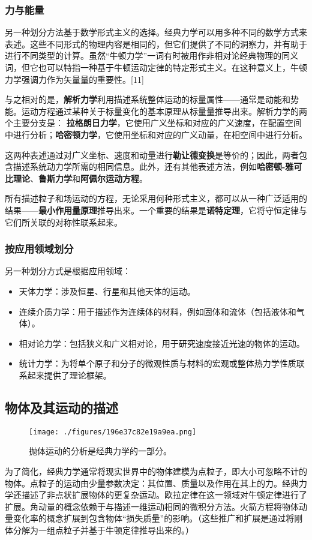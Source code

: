 \subsubsection{力与能量}  
另一种划分方法基于数学形式主义的选择。经典力学可以用多种不同的数学方式来表述。这些不同形式的物理内容是相同的，但它们提供了不同的洞察力，并有助于进行不同类型的计算。虽然“牛顿力学”一词有时被用作非相对论经典物理的同义词，但它也可以特指一种基于牛顿运动定律的特定形式主义。在这种意义上，牛顿力学强调力作为矢量量的重要性。[11]  

与之相对的是，\textbf{解析力学}利用描述系统整体运动的标量属性——通常是动能和势能。运动方程通过某种关于标量变化的基本原理从标量量推导出来。解析力学的两个主要分支是：  \textbf{拉格朗日力学}，它使用广义坐标和对应的广义速度，在配置空间中进行分析；\textbf{哈密顿力学}，它使用坐标和对应的广义动量，在相空间中进行分析。  

这两种表述通过对广义坐标、速度和动量进行\textbf{勒让德变换}是等价的；因此，两者包含描述系统动力学所需的相同信息。此外，还有其他表述方法，例如\textbf{哈密顿-雅可比理论}、\textbf{鲁斯力学}和\textbf{阿佩尔运动方程}。

所有描述粒子和场运动的方程，无论采用何种形式主义，都可以从一种广泛适用的结果——\textbf{最小作用量原理}推导出来。一个重要的结果是\textbf{诺特定理}，它将守恒定律与它们所关联的对称性联系起来。
\subsubsection{按应用领域划分}  
另一种划分方式是根据应用领域：  

\begin{itemize}
\item  天体力学：涉及恒星、行星和其他天体的运动。  
\item  连续介质力学：用于描述作为连续体的材料，例如固体和流体（包括液体和气体）。  
\item  相对论力学：包括狭义和广义相对论，用于研究速度接近光速的物体的运动。  
\item  统计力学：为将单个原子和分子的微观性质与材料的宏观或整体热力学性质联系起来提供了理论框架。
\end{itemize}
\subsection{物体及其运动的描述}
\begin{figure}[ht]
\centering
\texttt{[image: ./figures/196e37c82e19a9ea.png]}
\caption{抛体运动的分析是经典力学的一部分。} \label{fig_JDLX_2}
\end{figure}
为了简化，经典力学通常将现实世界中的物体建模为点粒子，即大小可忽略不计的物体。点粒子的运动由少量参数决定：其位置、质量以及作用在其上的力。经典力学还描述了非点状扩展物体的更复杂运动。欧拉定律在这一领域对牛顿定律进行了扩展。角动量的概念依赖于与描述一维运动相同的微积分方法。火箭方程将物体动量变化率的概念扩展到包含物体“损失质量”的影响。（这些推广和扩展是通过将刚体分解为一组点粒子并基于牛顿定律推导出来的。）


